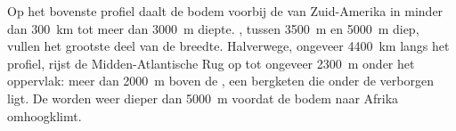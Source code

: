 \begin{example}
Op het bovenste profiel daalt de bodem voorbij de  van Zuid-Amerika in
minder dan \qty{300}{km} tot meer dan \qty{3000}{m} diepte. , tussen \qty{3500}{m} en \qty{5000}{m} diep, vullen het grootste
deel van de breedte. Halverwege, ongeveer \qty{4400}{km} langs het profiel,
rijst de Midden-Atlantische Rug op tot ongeveer \qty{2300}{m} onder het
oppervlak: meer dan \qty{2000}{m} boven de , een bergketen die
onder de  verborgen ligt. De  worden weer dieper dan
\qty{5000}{m} voordat de bodem naar Afrika omhoogklimt.
\end{example}

